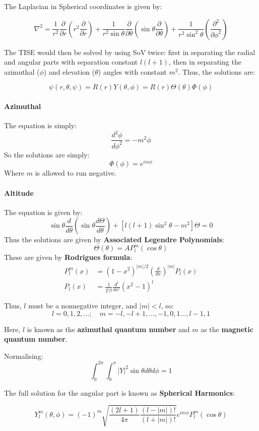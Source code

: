 \documentclass[12pt]{article}
\begin{document}
The Laplacian in Spherical coordinates is given by:

\[\nabla^2 = \frac{1}{r^2}\frac{\partial }{\partial r}\left(r^2\frac{\partial }{\partial r}\right) + \frac{1}{r^2\sin{\theta}}\frac{\partial}{\partial \theta}\left(\sin{\theta}\frac{\partial}{\partial \theta}\right) + \frac{1}{r^2\sin^2{\theta}}\left(\frac{\partial^2}{\partial \phi^2}\right) \]

The TISE would then be solved by using SoV twice: first in separating the radial and angular parts with separation constant $l(l+1)$, then in separating the azimuthal ($\phi$) and elevation ($\theta$) angles with constant $m^2$. Thus, the solutions are:

\[\psi(r, \theta, \psi) = R(r) Y(\theta,\phi) = R(r)\Theta(\theta)\Phi(\phi)\]

\paragraph{Azimuthal}
The equation is simply:
\[ \frac{d^2\phi}{d\phi^2} = -m^2\phi\]
So the solutions are simply:
\[\boxed{\Phi(\phi) = e^{im\phi}}\]
Where $m$ is allowed to run negative.


\paragraph{Altitude}
The equation is given by:
\[ \sin{\theta}\frac{d}{d\theta}\left(\sin{\theta}\frac{d\Theta}{d\theta}\right) + [l(l+1)\sin^2{\theta}-m^2]\Theta=0\]
Thus the solutions are given by \textbf{Associated Legendre Polynomials}:
\[\boxed{\Theta(\theta) = AP^m_l(\cos{\theta})}\]
These are given by \textbf{Rodrigues formula}:
\begin{align*}
    P^m_l(x) &= (1-x^2)^{|m|/2}\left(\frac{d}{dx}\right)^{|m|}P_l(x)\\
    P_l(x) &= \frac{1}{2^ll!}\frac{d^l}{dx^l}(x^2-1)^l
\end{align*}

Thus, $l$ must be a nonnegative integer, and $|m| < l$, so:
\[ l = 0,1,2,...; \quad m = -l,-l+1,...,-1,0,1...,l-1,1\]

Here, $l$ is known as the \textbf{azimuthal quantum number} and $m$ as the \textbf{magnetic quantum number}.

Normalising:
\[\int^{2\pi}_0\int^{\pi}_{0}|Y|^2\sin\theta d\theta d\phi = 1\]

The full solution for the angular part is known as \textbf{Spherical Harmonics}:

\[Y^m_l(\theta,\phi) = (-1)^m\sqrt{\frac{(2l+1)}{4\pi}\frac{(l-|m|)!}{(l+|m|)!}}e^{im\phi}P^m_l(\cos\theta)\]
\end{document}

